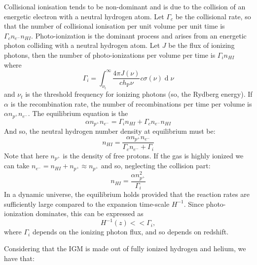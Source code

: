 Collisional ionisation tends to be non-dominant and is due to the collision of an energetic electron with a neutral hydrogen atom. Let $\Gamma_c$ be the collisional rate, so that the number of collisional ionisation per unit volume per unit time is $\Gamma_c n_{e^-}n_{HI}$. Photo-ionization is the dominant process and arises from an energetic photon colliding with a neutral hydrogen atom. Let $J$ be the flux of ionizing photons, then the number of photo-ionizations per volume per time is $\Gamma_i n_{HI}$ where 
\begin{equation}
    \Gamma_i=\int_{\nu_\mathrm{t}}^\infty\frac{4\pi J(\nu)}{ch_\mathrm{P}\nu}c\sigma(\nu)\operatorname{d}\nu
\end{equation}
and $\nu_t$ is the threshold frequency for ionizing photons (so, the Rydberg energy). If $\alpha$ is the recombination rate, the number of recombinations per time per volume is $\alpha n_{p^+}n_{e^-}$.
The equilibrium equation is the
\begin{equation}
    \alpha n_{p^+}n_{e^-}=\Gamma_i n_{HI}+\Gamma_cn_{e^-}n_{HI}  
\end{equation}
And so, the neutral hydrogen number density at equilibrium must be:
\begin{equation}
    n_{HI}=\frac{\alpha n_{p^+}n_{e^-}}{\Gamma_c n_{e^-}+\Gamma_i}
\end{equation}
Note that here $n_{p^+}$ is the density of free protons. If the gas is highly ionized we can take $n_{e^-}=n_{HI}+n_{p^+}\approx n_{p^+}$ and so, neglecting the collision part:
\begin{equation}
    n_{HI}=\frac{\alpha n_{p^+}^2}{\Gamma_i}
\end{equation}
In a dynamic universe, the equilibrium holds provided that the reaction rates are sufficiently large compared to the expansion time-scale $H^{-1}$. Since photo-ionization dominates, this can be expressed as 
\begin{equation}
    H^{-1}(z)<< \Gamma_i,
\end{equation}
where $\Gamma_i$ depends on the ionizing photon flux, and so depends on redshift.
















Considering that the IGM is made out of fully ionized hydrogen and helium, we have that:

